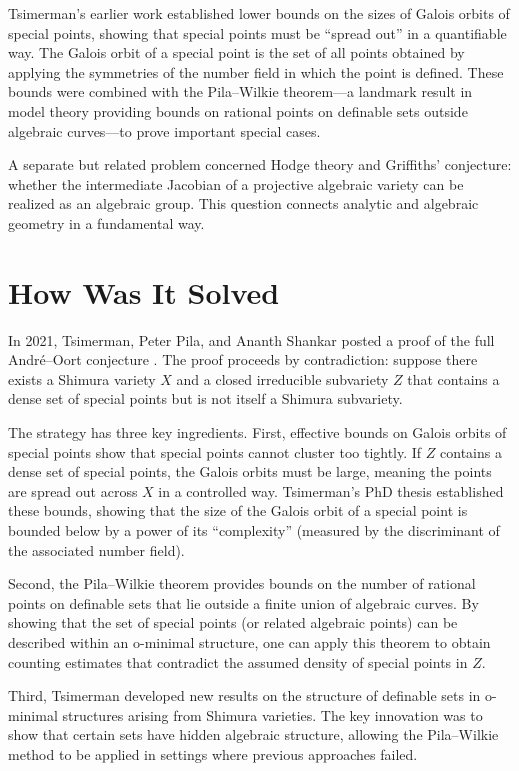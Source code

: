 Tsimerman's earlier work established lower bounds on the sizes of Galois orbits of special points, showing that special points must be ``spread out'' in a quantifiable way. The Galois orbit of a special point is the set of all points obtained by applying the symmetries of the number field in which the point is defined. These bounds were combined with the Pila--Wilkie theorem---a landmark result in model theory providing bounds on rational points on definable sets outside algebraic curves---to prove important special cases.

A separate but related problem concerned Hodge theory and Griffiths' conjecture: whether the intermediate Jacobian of a projective algebraic variety can be realized as an algebraic group. This question connects analytic and algebraic geometry in a fundamental way.

\section{How Was It Solved}

In 2021, Tsimerman, Peter Pila, and Ananth Shankar posted a proof of the full Andr\'{e}--Oort conjecture \cite{pilashankartsimerman2021}. The proof proceeds by contradiction: suppose there exists a Shimura variety $X$ and a closed irreducible subvariety $Z$ that contains a dense set of special points but is not itself a Shimura subvariety.

The strategy has three key ingredients. First, effective bounds on Galois orbits of special points show that special points cannot cluster too tightly. If $Z$ contains a dense set of special points, the Galois orbits must be large, meaning the points are spread out across $X$ in a controlled way. Tsimerman's PhD thesis established these bounds, showing that the size of the Galois orbit of a special point is bounded below by a power of its ``complexity'' (measured by the discriminant of the associated number field).

Second, the Pila--Wilkie theorem provides bounds on the number of rational points on definable sets that lie outside a finite union of algebraic curves. By showing that the set of special points (or related algebraic points) can be described within an o-minimal structure, one can apply this theorem to obtain counting estimates that contradict the assumed density of special points in $Z$.

Third, Tsimerman developed new results on the structure of definable sets in o-minimal structures arising from Shimura varieties. The key innovation was to show that certain sets have hidden algebraic structure, allowing the Pila--Wilkie method to be applied in settings where previous approaches failed.

